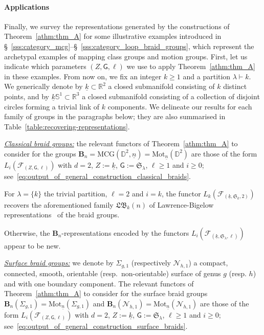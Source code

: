 \documentclass[AHL,Unicode,published]{cedram}
\newcommand{\MCG}{\mathrm{MCG}}
\newcommand{\Mot}{\mathrm{Mot}}
\newcommand{\B}{\ensuremath{\mathbf{B}}}
\newcommand{\Sym}{\mathfrak{S}}
\newcommand{\LB}{\mathfrak{LB}}
\newcommand{\N}{\mathscr{N}}
\newcommand{\sG}{\mathsf{G}}
\newcommand{\cF}{\mathcal{F}}
\newcommand{\bD}{\mathbb{D}}
\newcommand{\bR}{\mathbb{R}}
\newcommand{\bS}{\mathbb{S}}
\renewcommand{\geq}{\geqslant}
\begin{document}
\paragraph*{Applications}
Finally, we survey the representations generated by the constructions of Theorem~\ref{athm:thm_A} for some illustrative examples introduced in \S~\ref{sss:category_mcg}--\S~\ref{sss:category_loop_braid_groups}, which represent the archetypal examples of mapping class groups and motion groups. First, let us indicate which parameters $(Z,\sG,\ell)$ we use to apply Theorem~\ref{athm:thm_A} in these examples. From now on, we fix an integer $k\geq 1$ and a partition $\lambda \vdash k$. We generically denote by $\underline{k}\subset \bR^{2}$ a closed submanifold consisting of $k$ distinct points, and by $\underline{k}\bS^{1} \subset \bR^{3}$ a closed submanifold consisting of a collection of disjoint circles forming a trivial link of $k$ components. We delineate our results for each family of groups in the paragraphs below; they are also summarised in Table~\ref{table:recovering-representations}.

\vspace*{4pt}
\noindent\underline{\emph{Classical braid groups:}} the relevant functors of Theorem~\ref{athm:thm_A} to consider for the groups $\B_{n}=\MCG(\bD^{2},\underline{n})=\Mot_{\underline{n}}(\bD^{2})$ are those of the form $L_{i}(\cF_{(Z,\sG,\ell)})$ with $d=2$, $Z:=\underline{k}$, $\sG:=\Sym_{\lambda}$, $\ell\geq 1$ and $i\geq 0$; see~\eqref{eq:output_of_general_construction_classical_braids}.

\begin{theo}\label{athm:thm_C_classical_braid_groups}
For $\lambda = \boldsymbol{\{} k \boldsymbol{\}}$ the trivial partition, $\ell = 2$ and $i=k$, the functor $L_{k}(\cF_{(\underline{k},\Sym_{k},2)})$ recovers the aforementioned family $\LB_{k}(n)$ of Lawrence-Bigelow representations~\cite{Lawrence1,bigelow2001braid} of the braid groups.

Otherwise, the $\B_{n}$-representations encoded by the functors $L_{i}(\cF_{(\underline{k},\Sym_{\lambda},\ell)})$ appear to be new.
\end{theo}

\noindent\underline{\emph{Surface braid groups:}} we denote by $\Sigma_{g,1}$ (respectively $\N_{h,1}$) a compact, connected, smooth, orientable (resp.~non-orientable) surface of genus $g$ (resp. $h$) and with one boundary component. The relevant functors of Theorem~\ref{athm:thm_A} to consider for the surface braid groups $\B_{n}(\Sigma_{g,1})=\Mot_{\underline{n}}(\Sigma_{g,1})$ and $\B_{n}(\N_{h,1})=\Mot_{\underline{n}}(\N_{h,1})$ are those of the form $L_{i}(\cF_{(Z,\sG,\ell)})$ with $d=2$, $Z:=\underline{k}$, $\sG:=\Sym_{\lambda}$, $\ell\geq 1$ and $i\geq 0$; see~\eqref{eq:output_of_general_construction_surface_braids}.
\end{document}
